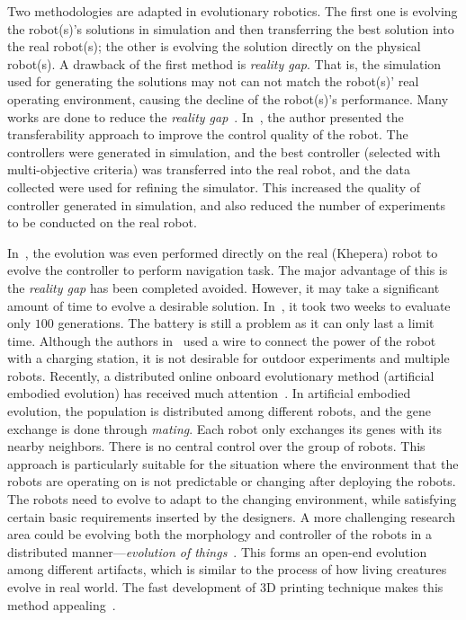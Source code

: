 Two methodologies are adapted in evolutionary robotics. The first one is evolving the robot(s)'s solutions in simulation and then transferring the best solution into the real robot(s); the other is evolving the solution directly on the physical robot(s). A drawback of the first method is \textit{reality gap}. That is, the simulation used for generating the solutions may not can not match the robot(s)' real operating environment, causing the decline of the robot(s)'s performance. Many works are done to reduce the \textit{reality gap}~\cite{Koos:TEVC:2013, Koos:IJRR:2013, Alan:2014}. In~\cite{Koos:TEVC:2013, Koos:IJRR:2013}, the author presented the transferability approach to improve the control quality of the robot. The controllers were generated in simulation, and the best controller (selected with multi-objective criteria) was transferred into the real robot, and the data collected were used for refining the simulator. This increased the quality of controller generated in simulation, and also reduced the number of experiments to be conducted on the real robot. 

In~\cite{Floreano1996}, the evolution was even performed directly on the real (Khepera) robot to evolve the controller to perform navigation task. The major advantage of this is the \textit{reality gap} has been completed avoided. However, it may take a significant amount of time to evolve a desirable solution. In~\cite{Floreano1996}, it took two weeks to evaluate only $100$ generations. The battery is still a problem as it can only last a limit time. Although the authors in~\cite{Floreano1996} used a wire to connect the power of the robot with a charging station, it is not desirable for outdoor experiments and multiple robots. Recently, a distributed online onboard evolutionary method (artificial embodied evolution) has received much attention~\cite{Watson2012, eiben:inria-00531455, Eiben:EI:2012}. In artificial embodied evolution, the population is distributed among different robots, and the gene exchange is done through \textit{mating}. Each robot only exchanges its genes with its nearby neighbors. There is no central control over the group of robots. This approach is particularly suitable for the situation where the environment that the robots are operating on is not predictable or changing after deploying the robots. The robots need to evolve to adapt to the changing environment, while satisfying certain basic requirements inserted by the designers. A more challenging research area could be evolving both the morphology and controller of the robots in a distributed manner---\textit{evolution of things}~\cite{Eiben:Nature:2015}. This forms an open-end evolution among different artifacts, which is similar to the process of how living creatures evolve in real world. The fast development of 3D printing technique makes this method appealing~\cite{Tumbleston20032015}. 

